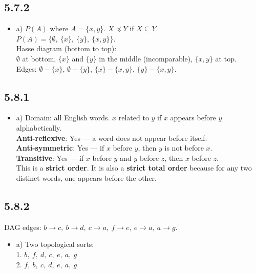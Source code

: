 \documentclass{article}
\begin{document}
\subsection*{5.7.2}
\begin{itemize}
    \item a) $P(A)$ where $A = \{x, y\}$. $X \preceq Y$ if $X \subseteq Y$.\\
    $P(A) = \{\emptyset,\ \{x\},\ \{y\},\ \{x,y\}\}$.\\
    Hasse diagram (bottom to top):\\
    $\emptyset$ at bottom, $\{x\}$ and $\{y\}$ in the middle (incomparable), $\{x,y\}$ at top.\\
    Edges: $\emptyset - \{x\}$, $\emptyset - \{y\}$, $\{x\} - \{x,y\}$, $\{y\} - \{x,y\}$.
\end{itemize}

\subsection*{5.8.1}
\begin{itemize}
    \item a) Domain: all English words. $x$ related to $y$ if $x$ appears before $y$ alphabetically.\\
    \textbf{Anti-reflexive}: Yes --- a word does not appear before itself.\\
    \textbf{Anti-symmetric}: Yes --- if $x$ before $y$, then $y$ is not before $x$.\\
    \textbf{Transitive}: Yes --- if $x$ before $y$ and $y$ before $z$, then $x$ before $z$.\\
    This is a \textbf{strict order}. It is also a \textbf{strict total order} because for any two distinct words, one appears before the other.
\end{itemize}

\subsection*{5.8.2}
DAG edges: $b \to c,\ b \to d,\ c \to a,\ f \to e,\ e \to a,\ a \to g$.
\begin{itemize}
    \item a) Two topological sorts:\\
    1. $b,\ f,\ d,\ c,\ e,\ a,\ g$\\
    2. $f,\ b,\ c,\ d,\ e,\ a,\ g$
\end{itemize}
\end{document}
